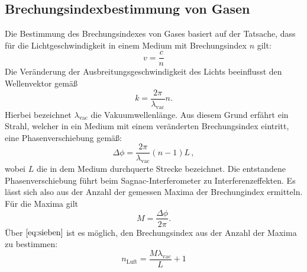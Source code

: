 \subsection{Brechungsindexbestimmung von Gasen}
Die Bestimmung des Brechungsindexes von Gases basiert auf der Tatsache, dass für die Lichtgeschwindigkeit in einem Medium mit Brechungsindex $n$ gilt:
\begin{equation}
  v=\frac{c}{n}
\end{equation}
Die Veränderung der Ausbreitungsgeschwindigkeit des Lichts beeinflusst den Wellenvektor gemäß
\begin{equation}
  k = \frac{2\pi}{\lambda_{\text{vac}}}n.
\end{equation}
Hierbei bezeichnet $\lambda_{\text{vac}}$ die Vakuumwellenlänge.
Aus diesem Grund erfährt ein Strahl, welcher in ein Medium mit einem veränderten Brechungsindex eintritt, eine Phasenverschiebung gemäß:
\begin{equation}
  \Delta \phi= \frac{2\pi}{\lambda_{\text{vac}}}(n-1)L \, ,
  \label{eq:sieben}
\end{equation}
wobei  $L$ die in dem Medium durchquerte Strecke bezeichnet. Die entstandene Phasenverschiebung führt beim Sagnac-Interferometer zu Interferenzeffekten. Es lässt sich also
aus der Anzahl der gemessen Maxima der Brechungindex ermitteln. Für die Maxima gilt
\begin{equation}
  M = \frac{\Delta \phi}{2 \pi}.
\end{equation}
Über $\ref{eq:sieben}$ ist es möglich, den Brechungsindex aus der Anzahl der Maxima zu bestimmen:
\begin{equation}
  n_\text{Luft}=\frac{M\lambda_{\text{vac}}}{L}+1
  \label{eq:gas}
\end{equation}
